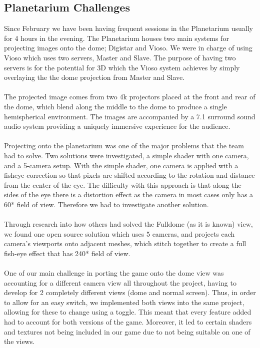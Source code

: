 \documentclass[11pt,a4paper]{article}
\begin{document}
\subsection{Planetarium Challenges}
 Since February we have been having frequent sessions in the Planetarium usually for 4 hours in the evening. The Planetarium houses two main systems for projecting images onto the dome; Digistar and Vioso. We were in charge of using Vioso which uses two servers, Master and Slave. The purpose of having two servers is for the potential for 3D which the Vioso system achieves by simply overlaying the the dome projection from Master and Slave. \\ \\
 The projected image comes from two 4k projectors placed at the front and rear of the dome, which blend along the middle to the dome to produce a single hemispherical environment. The images are accompanied by a 7.1 surround sound audio system providing a uniquely immersive experience for the audience.  \\ \\ 
 Projecting onto the planetarium was one of the major problems that the team had to solve. Two solutions were investigated, a simple shader with one camera, and a 5-camera setup. 
 With the simple shader, one camera is applied with a fisheye correction so that pixels are shifted according to the rotation and distance from the center of the eye. The difficulty with this approach is that along the sides of the eye there is a distortion effect as the camera in most cases only has a 60* field of view. Therefore we had to investigate another solution. \\ \\
 Through research into how others had solved the Fulldome (as it is known) view, we found one open source solution which uses 5 cameras, and projects each camera's viewports onto adjacent meshes, which stitch together to create a full fish-eye effect that has 240* field of view. \\ \\
 One of our main challenge in porting the game onto the dome view was accounting for a different camera view all throughout the project, having to develop for 2 completely different views (dome and normal screen). Thus, in order to allow for an easy switch, we implemented both views into the same project, allowing for these to change using a toggle. This meant that every feature added had to account for both versions of the game. Moreover, it led to certain shaders and textures not being included in our game due to not being suitable on one of the views.
      \pagebreak
\end{document}
